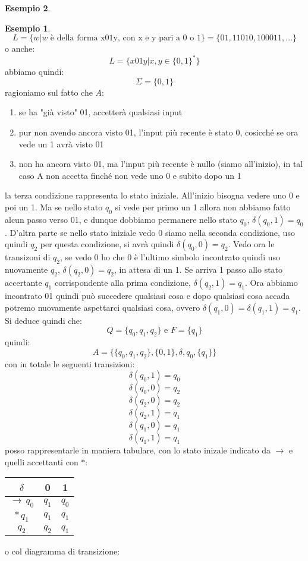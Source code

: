 \documentclass[a4paper]{book}
\theoremstyle{definition}%
\newtheorem*{esempio}{Esempio}
\begin{document}
\begin{esempio}
{\begin{esempio}
$$L=\{w|w \mbox{ è della forma x01y, con x e y pari a 0 o 1} \}=\{01,11010,100011,...\}$$
o anche:
$$L=\{x01y| x,y\in\{0,1\}^* \}$$
abbiamo quindi:
$$\Sigma=\{0,1\}$$
ragioniamo sul fatto che $A$:
\begin{enumerate}
\item se ha "già visto" 01, accetterà qualsiasi input
\item pur non avendo ancora visto 01, l'input più recente è stato 0, cosicché se ora vede un 1 avrà visto 01
\item non ha ancora visto 01, ma l'input più recente è nullo (siamo all'inizio), in tal caso A non accetta finché non vede
uno 0 e subito dopo un 1
\end{enumerate} 
la terza condizione rappresenta lo stato iniziale. All'inizio bisogna vedere uno 0 e poi un 1. Ma se nello stato $q_0$ si vede per primo un 1 allora non abbiamo fatto alcun passo verso 01, e dunque dobbiamo permanere nello stato $q_0$, $\delta(q_0,1)=q_0$. D'altra parte se nello stato iniziale vedo 0 siamo nella seconda condizione, uso quindi $q_2$ per questa condizione, si avrà quindi $\delta(q_0,0)=q_2$. Vedo ora le transizoni di $q_2$, se vedo 0 ho che 0 è l'ultimo simbolo incontrato quindi uso nuovamente $q_2$, $\delta(q_2,0)=q_2$, in attesa di un 1. Se arriva 1 passo allo stato accertante $q_1$ corrispondente alla prima condizione, $\delta(q_2,1)=q_1$. Ora abbiamo incontrato 01 quindi può succedere qualsiasi cosa e dopo qualsiasi cosa accada potremo nuovamente aspettarci qualsiasi cosa, ovvero $\delta(q_1,0)=\delta(q_1,1)=q_1$. Si deduce quindi che:
$$Q=\{q_0,q_1,q_2\} \mbox{ e } F=\{q_1\}$$
quindi:
$$A=\{\{q_0,q_1,q_2\} ,\{0,1\}, \delta, q_0, \{q_1\} \}$$
con in totale le seguenti transizioni:
$$\delta(q_0,1)=q_0$$
$$\delta(q_0,0)=q_2$$
$$\delta(q_2,0)=q_2$$
$$\delta(q_2,1)=q_1$$
$$\delta(q_1,0)=q_1$$
$$\delta(q_1,1)=q_1$$
posso rappresentarle in maniera tabulare, con lo stato inizale indicato da $\to$ e quelli accettanti con $*$:
\begin{center}
\begin{tabular}{c|c|c}
$\delta$ & 0 & 1 \\
\hline
$\to\,q_0$ & $q_1$ & $q_0$\\
\hline
$*\,q_1$ & $q_1$ & $q_1$\\
\hline
$q_2$ & $q_2$ & $q_1$
\end{tabular}
\end{center}
o col diagramma di transizione:
\begin{center}
\begin{tikzpicture}[shorten >=1pt,node distance=2cm,on grid,auto] 

\end{tikzpicture}
\end{center}
\end{esempio}}
\end{esempio}
\end{document}
